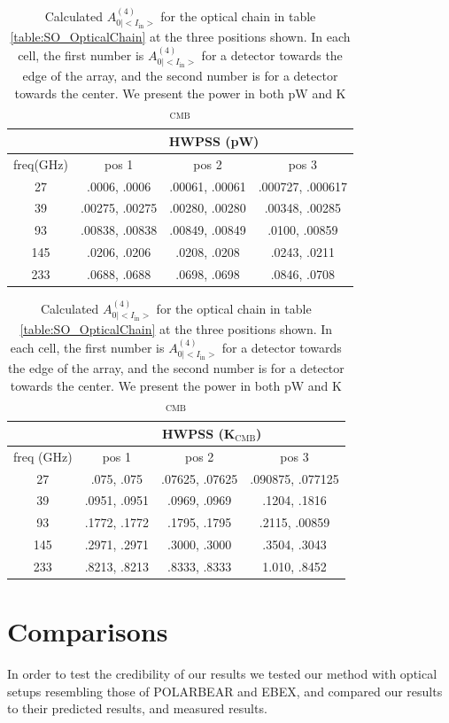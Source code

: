 \documentclass{article}
\theoremstyle{remark}
\newcommand{\tab}{\hspace*{2em}}
\renewcommand{\t}[1]{\text{#1}}
\newcommand{\AI}{A^{(4)}_{0|<I_{\t{in}}>}}
\begin{document}
\begin{table}
\centering
\begin{tabular}{ |c|c|c|c| } 
	\hline
	 & \multicolumn{3}{|c|}{HWPSS (pW)}\\
	\hline
	freq(GHz) & pos 1 	& pos 2 & pos 3 \\ \hline
	27  & .0006, .0006 	 & .00061, .00061 & .000727, .000617 \\
	39  & .00275, .00275 & .00280, .00280 & .00348, .00285	 \\
	93  & .00838, .00838 & .00849, .00849 & .0100, .00859 	 \\
	145 & .0206, .0206  & .0208, .0208   & .0243, .0211 	 \\
	233 & .0688, .0688   & .0698, .0698   & .0846, .0708 	 \\
	\hline	
\end{tabular}

\begin{tabular}{ |c|c|c|c| } 
	\hline
	 & \multicolumn{3}{|c|}{HWPSS (K$_\t{CMB}$)}\\
	\hline
	freq (GHz) & pos 1 	& pos 2 & pos 3 \\ \hline
	27  & .075, .075 	 & .07625, .07625 & .090875, .077125 \\
	39  & .0951, .0951 & .0969, .0969 & .1204, .1816	 \\
	93  & .1772, .1772 & .1795, .1795 & .2115, .00859 	 \\
	145 & .2971, .2971  & .3000, .3000   & .3504, .3043 	 \\
	233 & .8213, .8213   & .8333, .8333   & 1.010, .8452 	 \\
	\hline	
\end{tabular}

\caption{ Calculated $\AI$ for the optical chain in table \ref{table:SO_OpticalChain} at the three positions shown.
In each cell, the first number is $\AI$ for a detector towards the edge of the array, and the second number 
is for a detector towards the center. We present the power in both pW and K$_\t{CMB}$
}
\label{table:SO_powers}
\end{table}




\section*{Comparisons}

\tab In order to test the credibility of our results we tested our method with optical setups resembling those of POLARBEAR and EBEX,
and compared our results to their predicted results, and measured results. 
\end{document}
